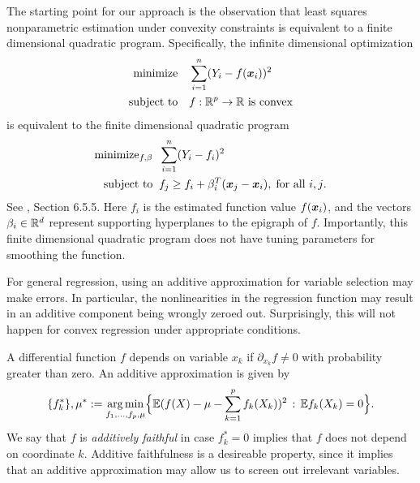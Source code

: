 The starting point for our approach is the observation that least squares
nonparametric estimation under convexity constraints is equivalent to
a finite dimensional quadratic program.  Specifically, the infinite
dimensional optimization 
\begin{align}
\begin{split}
\text{minimize} & \quad \sum_{i=1}^n (Y_i - f(\mbox{\boldmath $x$}_i))^2 \\
\text{subject to} &  \quad f:{\mathbb R}^p\rightarrow{\mathbb R}\ \text{is
  convex}
\end{split}
\end{align}
is equivalent to the finite dimensional quadratic
program 
\begin{align}
\label{eq:convreg}
\begin{split}
\text{minimize}_{f, \beta} & \;\; \sum_{i=1}^n (Y_i - f_i)^2 \\
\text{subject to} & \;\; f_j \geq f_i + \beta_i^T (\mbox{\boldmath $x$}_j-\mbox{\boldmath $x$}_i),\; \text{for
    all $i,j$}.
\end{split}
\end{align}
See \cite{Boyd04}, Section 6.5.5.
Here $f_i$ is the estimated function value $f(\mbox{\boldmath $x$}_i)$, and the vectors
$\beta_i \in {\mathbb R}^d$ represent supporting hyperplanes to the
epigraph of $f$.  Importantly, this finite dimensional quadratic program does
not have tuning parameters for smoothing the function. 

For general regression, using an additive approximation for variable
selection may make errors.  In particular, the nonlinearities in the
regression function may result in an additive component being wrongly
zeroed out.  Surprisingly, this will not happen for convex regression
under appropriate conditions.

A differential function $f$ depends on variable $x_k$ if
$\partial_{x_k} f \neq 0$ with probability greater than zero.  An additive approximation is given by
\begin{equation}
\{f_k^*\}, \mu^* := \mathop{\text{\rm arg\,min}}_{f_1,\ldots, f_p, \mu} \Bigl\{ 
             {\mathbb E} ( f(X) - \mu - \sum_{k=1}^p f_k(X_k))^2 
         \,:\, {\mathbb E} f_k(X_k) = 0 \Bigr\}.
\end{equation}
We say that $f$ is \textit{additively faithful} in case $f^*_k = 0$
implies that $f$ does not depend on coordinate $k$.
Additive faithfulness is a desireable property,
since it implies that an additive approximation may allow us to 
screen out irrelevant variables.

